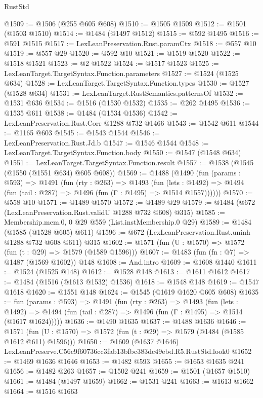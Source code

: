 \begin{lexlean}{RustStd}
\begin{coremodule}
@1509 := @1506 (@255 @605 @608)
@1510 := @1505 @1509
@1512 := @1501 (@1503 @1510)
@1514 := @1484 (@1497 @1512)
@1515 := @592 @1495
@1516 := @591 @1515
@1517 := LexLeanPreservation.Rust.paramCtx
@1518 := @557 @10
@1519 := @557 @29
@1520 := @592 @10
@1521 := @1519 @1520
@1522 := @1518 @1521
@1523 := @2 @1522
@1524 := @1517 @1523
@1525 := LexLeanTarget.TargetSyntax.Function.parameters
@1527 := @1524 (@1525 @634)
@1528 := LexLeanTarget.TargetSyntax.Function.types
@1530 := @1527 (@1528 @634)
@1531 := LexLeanTarget.RustSemantics.patternsOf
@1532 := @1531 @636
@1534 := @1516 (@1530 @1532)
@1535 := @262 @1495
@1536 := @1535 @611
@1538 := @1484 (@1534 @1536)
@1542 := LexLeanPreservation.Rust.Corr @1288 @732 @1466
@1543 := @1542 @611
@1544 := @1165 @603
@1545 := @1543 @1544
@1546 := LexLeanPreservation.Rust.Jd.b
@1547 := @1546 @1544
@1548 := LexLeanTarget.TargetSyntax.Function.body
@1550 := @1547 (@1548 @634)
@1551 := LexLeanTarget.TargetSyntax.Function.result
@1557 := @1538 (@1545 (@1550 (@1551 @634) @605 @608))
@1569 := @1488
    (@1490
      (fun (params : @593) =>
      @1491
        (fun (rty : @263) =>
        @1493
          (fun (lets : @1492) =>
          @1494 (fun (tail : @287) => @1496 (fun (Γ : @1495) => @1514 @1557))))))
@1570 := @558 @10
@1571 := @1489 @1570
@1572 := @1489 @29
@1579 := @1484 (@672 (LexLeanPreservation.Rust.validU @1288 @732 @608) @315)
@1585 := Membership.mem.{0, 0} @29 @559 (List.instMembership.{0} @29)
@1589 := @1484 (@1585 (@1528 @605) @611)
@1596 := @672 (LexLeanPreservation.Rust.uninh @1288 @732 @608 @611) @315
@1602 := @1571 (fun (U : @1570) => @1572 (fun (t : @29) => @1579 (@1589 @1596)))
@1607 := @1483 (fun (fn : @7) => @1487 (@1569 @1602)) @148
@1608 := And.intro
@1609 := @1608 @1440
@1611 := @1524 (@1525 @148)
@1612 := @1528 @148
@1613 := @1611 @1612
@1617 := @1484 (@1516 (@1613 @1532) @1536)
@1618 := @1548 @148
@1619 := @1547 @1618
@1620 := @1551 @148
@1624 := @1545 (@1619 @1620 @605 @608)
@1635 := fun (params : @593) =>
  @1491
    (fun (rty : @263) =>
    @1493
      (fun (lets : @1492) =>
      @1494 (fun (tail : @287) => @1496 (fun (Γ : @1495) => @1514 (@1617 @1624)))))
@1636 := @1490 @1635
@1637 := @1488 @1636
@1646 := @1571 (fun (U : @1570) => @1572 (fun (t : @29) => @1579 (@1484 (@1585 @1612 @611) @1596)))
@1650 := @1609 (@1637 @1646) LexLeanPreserve.C56c9f60736cc3fab13bfbc383dc49ebd.R5.RustStd.look0
@1652 := @1469 @1636 @1646
@1653 := @1482 @593
@1655 := @1653 @1635 @241
@1656 := @1482 @263
@1657 := @1502 @241
@1659 := @1501 (@1657 @1510)
@1661 := @1484 (@1497 @1659)
@1662 := @1531 @241
@1663 := @1613 @1662
@1664 := @1516 @1663

\end{coremodule}
\end{lexlean}
